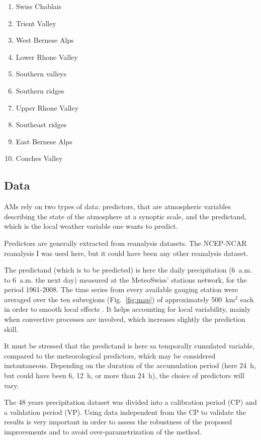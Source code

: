\documentclass[review]{elsarticle}
\begin{document}
\begin{enumerate}
	\item Swiss Chablais
	\item Trient Valley
	\item West Bernese Alps
	\item Lower Rhone Valley
	\item Southern valleys
	\item Southern ridges
	\item Upper Rhone Valley
	\item Southeast ridges
	\item East Bernese Alps
	\item Conches Valley
\end{enumerate}


\subsection{Data}
\label{sec:data}

AMs rely on two types of data: predictors, that are atmospheric variables describing the state of the atmosphere at a synoptic scale, and the predictand, which is the local weather variable one wants to predict.

Predictors are generally extracted from reanalysis datasets. The NCEP-NCAR reanalysis I \citep[6-hourly, 17 pressure levels at a resolution of 2.5\degree, see][]{Kalnay1996} was used here, but it could have been any other reanalysis dataset.

The predictand (which is to be predicted) is here the daily precipitation (6~a.m. to 6~a.m. the next day) measured at the MeteoSwiss' stations network, for the period 1961-2008. The time series from every available gauging station were averaged over the ten subregions (Fig.\ \ref{fig:map}) of approximately 500~km$^{2}$ each in order to smooth local effects \citep{Obled2002, Marty2012}. It helps accounting for local variability, mainly when convective processes are involved, which increases slightly the prediction skill.

It must be stressed that the predictand is here sa temporally cumulated variable, compared to the meteorological predictors, which may be considered instantaneous. Depending on the duration of the accumulation period (here 24~h, but could have been 6, 12~h, or more than 24~h), the choice of predictors will vary. 

The 48 years precipitation dataset was divided into a calibration period (CP) and a validation period (VP). Using data independent from the CP to validate the results is very important in order to assess the robustness of the proposed improvements and to avoid over-parametrization of the method.
\end{document}
